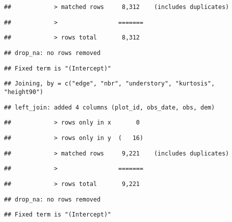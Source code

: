 \documentclass[
]{article}
\begin{document}
\begin{verbatim}
##            > matched rows     8,312    (includes duplicates)
\end{verbatim}

\begin{verbatim}
##            >                 =======
\end{verbatim}

\begin{verbatim}
##            > rows total       8,312
\end{verbatim}

\begin{verbatim}
## drop_na: no rows removed
\end{verbatim}

\begin{verbatim}
## Fixed term is "(Intercept)"
\end{verbatim}

\begin{verbatim}
## Joining, by = c("edge", "nbr", "understory", "kurtosis", "height90")
\end{verbatim}

\begin{verbatim}
## left_join: added 4 columns (plot_id, obs_date, obs, dem)
\end{verbatim}

\begin{verbatim}
##            > rows only in x       0
\end{verbatim}

\begin{verbatim}
##            > rows only in y  (   16)
\end{verbatim}

\begin{verbatim}
##            > matched rows     9,221    (includes duplicates)
\end{verbatim}

\begin{verbatim}
##            >                 =======
\end{verbatim}

\begin{verbatim}
##            > rows total       9,221
\end{verbatim}

\begin{verbatim}
## drop_na: no rows removed
\end{verbatim}

\begin{verbatim}
## Fixed term is "(Intercept)"
\end{verbatim}
\end{document}
